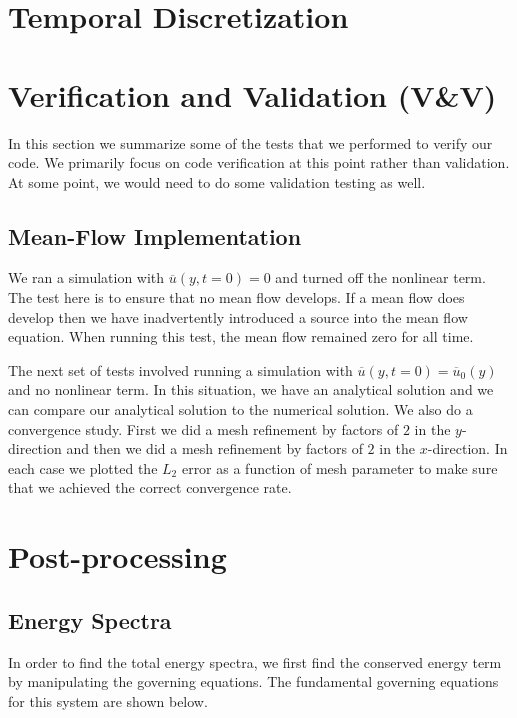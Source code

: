 \documentclass[12pt]{article}
\newcommand{\lr}[1]{\left(#1\right)}
\newcommand{\ua}{\overline{u}}
\begin{document}
  \section{Temporal Discretization}

  \section{Verification and Validation (V\&V)}
  In this section we summarize some of the tests that we performed to verify our code.  We 
  primarily focus on code verification at this point rather than validation.  At some point, 
  we would need to do some validation testing as well.

  \subsection{Mean-Flow Implementation}
    We ran a simulation with $\ua\lr{y,t=0} = 0$ and turned off the nonlinear term.  The 
    test here is to ensure that no mean flow develops.  If a mean flow does develop then 
    we have inadvertently introduced a source into the mean flow equation.  When running 
    this test, the mean flow remained zero for all time.

    The next set of tests involved running a simulation with $\ua\lr{y,t=0} = \ua_{0}\lr{y}$ 
    and no nonlinear term.  In this situation, we have an analytical solution and we can 
    compare our analytical solution to the numerical solution.  We also do a convergence 
    study.  First we did a mesh refinement by factors of $2$ in the $y$-direction and 
    then we did a mesh refinement by factors of $2$ in the $x$-direction.  In each case 
    we plotted the $L_{2}$ error as a function of mesh parameter to make sure that we 
    achieved the correct convergence rate.
    
    \section{Post-processing}
    
    \subsection{Energy Spectra}
    
    In order to find the total energy spectra, we first find the conserved energy term by manipulating the governing equations. The fundamental governing equations for this system are shown below.
    
\end{document}
